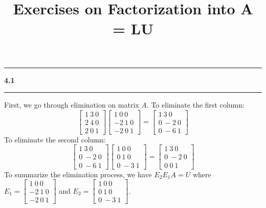 \documentclass[11pt]{article}
\newcommand\question[2]{\vspace{.25in}\hrule\textbf{#1 #2}\vspace{.5em}\hrule\vspace{.10in}}
\begin{document}
\raggedright
\newcommand\NAME{Haiying Cui}  %
\newcommand\ANDREWID{Christy}     %
\newcommand\HWNUM{4}              %

\title{Exercises on Factorization into A = LU}
\maketitle

\question{4.1}{}
First, we go through elimination on matrix \(A\). To eliminate the first column:
$$\begin{bmatrix} 1 \ 3 \ 0 \\ 2 \ 4 \ 0 \\ 2 \ 0 \ 1 \end{bmatrix}\begin{bmatrix} 1 \ 0 \ 0 \\ -2 \ 1 \ 0 \\ -2 \ 0 \ 1 \end{bmatrix} = \begin{bmatrix} 1 \ 3 \ 0 \\ 0 \ -2 \ 0 \\ 0 \ -6 \ 1 \end{bmatrix}$$
To eliminate the second column:
$$\begin{bmatrix} 1 \ 3 \ 0 \\ 0 \ -2 \ 0 \\ 0 \ -6 \ 1 \end{bmatrix}\begin{bmatrix} 1 \ 0 \ 0 \\ 0 \ 1 \ 0 \\ 0 \ -3 \ 1 \end{bmatrix} = \begin{bmatrix} 1 \ 3 \ 0 \\ 0 \ -2 \ 0 \\ 0 \ 0 \ 1 \end{bmatrix}$$
To summarize the elimination process, we have \(E_2E_1A = U\) where \(E_1 = \begin{bmatrix} 1 \ 0 \ 0 \\ -2 \ 1 \ 0 \\ -2 \ 0 \ 1 \end{bmatrix}\) and \(E_2 = \begin{bmatrix} 1 \ 0 \ 0 \\ 0 \ 1 \ 0 \\ 0 \ -3 \ 1 \end{bmatrix}\).
\end{document}
